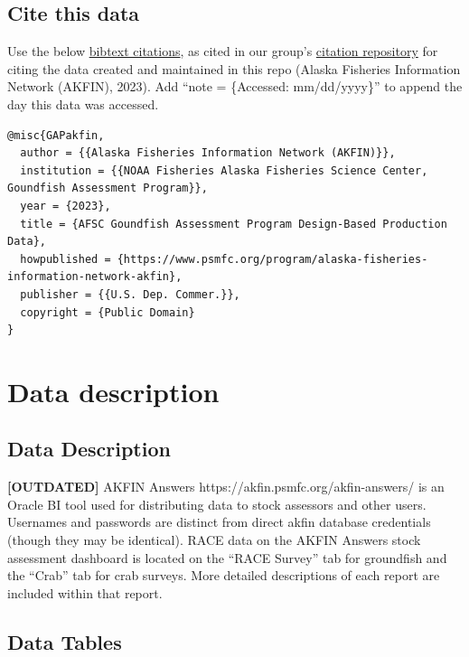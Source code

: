 \documentclass[
  letterpaper,
  oneside,
  open=any]{scrbook}
\begin{document}
\hypertarget{cite-this-data-1}{%
\section*{Cite this data}\label{cite-this-data-1}}


Use the below
\href{https://github.com/afsc-gap-products/gap_products/blob/main/code/CITATION_GAPakfin.bib}{bibtext
citations}, as cited in our group's
\href{https://github.com/afsc-gap-products/citations/blob/main/cite/bibliography.bib}{citation
repository} for citing the data created and maintained in this repo
(Alaska Fisheries Information Network (AKFIN), 2023). Add ``note =
\{Accessed: mm/dd/yyyy\}'' to append the day this data was accessed.

\begin{verbatim}
@misc{GAPakfin,
  author = {{Alaska Fisheries Information Network (AKFIN)}}, 
  institution = {{NOAA Fisheries Alaska Fisheries Science Center, Goundfish Assessment Program}},
  year = {2023}, 
  title = {AFSC Goundfish Assessment Program Design-Based Production Data},
  howpublished = {https://www.psmfc.org/program/alaska-fisheries-information-network-akfin},
  publisher = {{U.S. Dep. Commer.}},
  copyright = {Public Domain} 
}
\end{verbatim}

\hypertarget{data-description-2}{%
\chapter{Data description}\label{data-description-2}}

\hypertarget{data-description-3}{%
\section{Data Description}\label{data-description-3}}

\textbf{{[}OUTDATED{]}} AKFIN Answers
https://akfin.psmfc.org/akfin-answers/ is an Oracle BI tool used for
distributing data to stock assessors and other users. Usernames and
passwords are distinct from direct akfin database credentials (though
they may be identical). RACE data on the AKFIN Answers stock assessment
dashboard is located on the ``RACE Survey'' tab for groundfish and the
``Crab'' tab for crab surveys. More detailed descriptions of each report
are included within that report.

\hypertarget{data-tables-1}{%
\section{Data Tables}\label{data-tables-1}}
\end{document}
